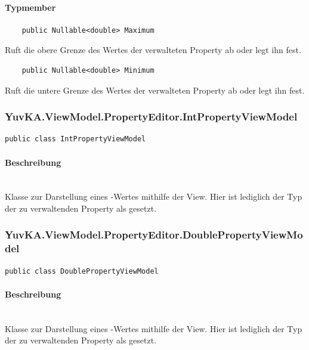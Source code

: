 \paragraph{Typmember}
\begin{itemize}

	\begin{verbatim}
	public Nullable<double> Maximum
	\end{verbatim}
	Ruft die obere Grenze des Wertes der verwalteten Property ab oder legt ihn fest.

	\begin{verbatim}
	public Nullable<double> Minimum
	\end{verbatim}
	Ruft die untere Grenze des Wertes der verwalteten Property ab oder legt ihn fest.

\end{itemize}




\subsubsection{YuvKA.ViewModel.PropertyEditor.IntPropertyViewModel}

\begin{verbatim}
public class IntPropertyViewModel
\end{verbatim}

\paragraph{Beschreibung}~\\
Klasse zur Darstellung eines -Wertes mithilfe der View. Hier ist lediglich der Typ der zu verwaltenden Property als  gesetzt.




\subsubsection{YuvKA.ViewModel.PropertyEditor.DoublePropertyViewModel}

\begin{verbatim}
public class DoublePropertyViewModel
\end{verbatim}

\paragraph{Beschreibung}~\\
Klasse zur Darstellung  eines -Wertes mithilfe der View. Hier ist lediglich der Typ der zu verwaltenden Property als  gesetzt.




